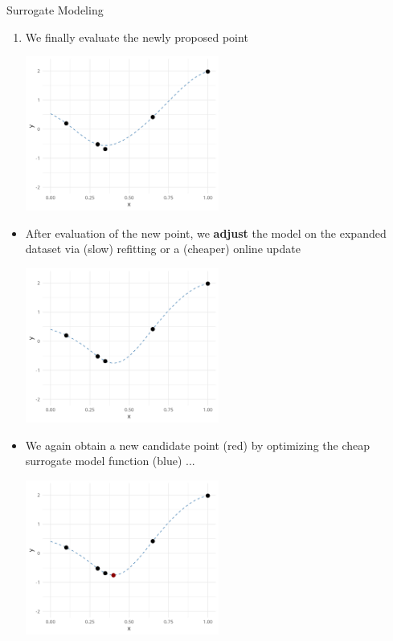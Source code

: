 \documentclass[11pt,compress,t,notes=noshow, xcolor=table]{beamer}
\begin{document}
\begin{vbframe}{Surrogate Modeling}
\begin{enumerate}
\framebreak 

\item We finally evaluate the newly proposed point
\vspace{+.45cm}

\begin{center}
  \includegraphics[width = 0.5\textwidth]{figure_man/loop_4.png}
\end{center}

\end{enumerate}

\framebreak 

\begin{itemize}

\item After evaluation of the new point, we \textbf{adjust} the model on the expanded dataset via (slow) refitting or a (cheaper) online update
\vspace{+.45cm}

\begin{center}
  \includegraphics[width = 0.5\textwidth]{figure_man/loop_5.png}
\end{center}

\framebreak 

\item We again obtain a new candidate point (red) by optimizing the cheap surrogate model function (blue) ...
\vspace{+.45cm}

\begin{center}
  \includegraphics[width = 0.5\textwidth]{figure_man/loop_6.png}
\end{center}


\end{itemize}
\end{vbframe}
\end{document}
